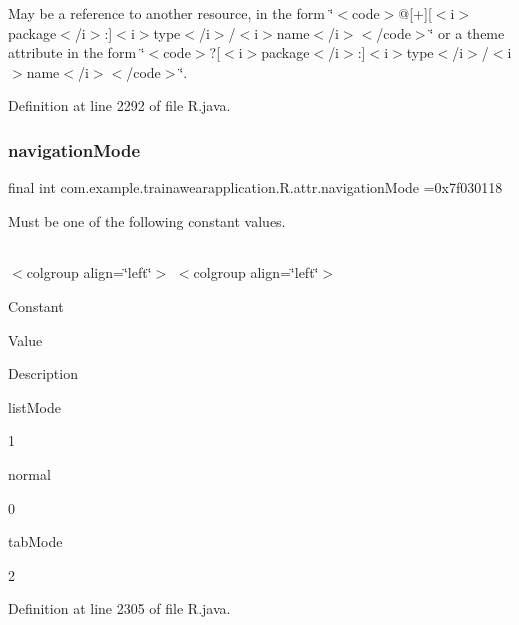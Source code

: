 May be a reference to another resource, in the form \char`\"{}$<$code$>$@\mbox{[}+\mbox{]}\mbox{[}$<$i$>$package$<$/i$>$\+:\mbox{]}$<$i$>$type$<$/i$>$/$<$i$>$name$<$/i$>$$<$/code$>$\char`\"{} or a theme attribute in the form \char`\"{}$<$code$>$?\mbox{[}$<$i$>$package$<$/i$>$\+:\mbox{]}$<$i$>$type$<$/i$>$/$<$i$>$name$<$/i$>$$<$/code$>$\char`\"{}. 

Definition at line 2292 of file R.\+java.

\mbox{\label{classcom_1_1example_1_1trainawearapplication_1_1_r_1_1attr_a44ddc1f3897306c7893cf19273a9711e}} 
\subsubsection{\texorpdfstring{navigationMode}{navigationMode}}
{\footnotesize\ttfamily final int com.\+example.\+trainawearapplication.\+R.\+attr.\+navigation\+Mode =0x7f030118\hspace{0.3cm}{\ttfamily [static]}}

Must be one of the following constant values.

\tabulinesep=1mm
\begin{longtabu}spread 0pt [c]{*{0}{|X[-1]}|}
\hline
\end{longtabu}
$<$colgroup align=\char`\"{}left\char`\"{}$>$ $<$colgroup align=\char`\"{}left\char`\"{}$>$ 

Constant

Value

Description 

list\+Mode

1

normal

0

tab\+Mode

2

Definition at line 2305 of file R.\+java.

\mbox{\label{classcom_1_1example_1_1trainawearapplication_1_1_r_1_1attr_a2a27937dc6d7ddeb8469614eb7cd1b81}} 
